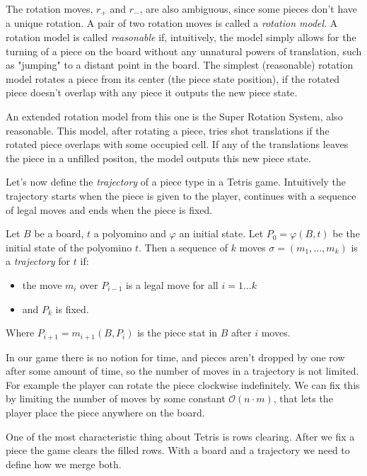 The rotation moves, $r_+$ and $r_-$, are also  ambiguous, since some pieces don't have a unique rotation. A pair of two rotation moves is called a \emph{rotation model}. A rotation model is called \emph{reasonable} if, intuitively, the model simply allows for the turning of a piece on the board without
any unnatural powers of translation, such as "jumping" to a distant point in the board. The simplest (reasonable) rotation model rotates a piece from its center (the piece state position), if the rotated piece doesn't overlap with any piece it outputs the new piece state.  

An extended rotation model from this one is the Super Rotation System, also reasonable. This model, after rotating a piece, tries shot translations if the rotated piece overlaps with some occupied cell. If any of the translations leaves the piece in a unfilled positon, the model outputs this new piece state.

\vspace{10px}
Let's now define the \emph{trajectory} of a piece type in a Tetris game. Intuitively the trajectory starts when the piece is given to the player, continues with a sequence of legal moves and ends when the piece is fixed. 

\begin{definition} 
  Let $B$ be a board, $t$ a polyomino and $\varphi$ an initial state. Let $P_0 = \varphi(B,t)$ be the initial state of the polyomino $t$. Then a sequence of $k$ moves $\sigma = (m_1, ..., m_k)$ is a \emph{trajectory} for $t$ if:

 \begin{itemize}
   \item the move $m_{i}$ over $P_{i-1}$ is a legal move for all $i = 1 \dots k$
  \item and $P_k$ is fixed.
 \end{itemize}
 
 Where $P_{i+1} = m_{i+1}(B,P_i)$ is the piece stat in $B$ after $i$ moves.
\end{definition}

In our game there is no notion for time, and pieces aren't dropped by one row after some amount of time, so the number of moves in a trajectory is not limited. For example the player can rotate the piece clockwise indefinitely. We can fix this by limiting the number of moves by some constant $\mathcal{O}(n \cdot m)$, that lets the player place the piece anywhere on the board.

One of the most characteristic thing about Tetris is rows clearing. After we fix a piece the game clears the filled rows. With a board and a trajectory we need to define how we merge both. 

